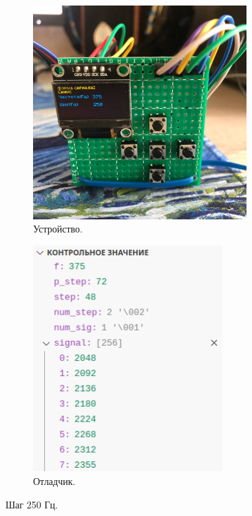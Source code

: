 	\begin{figure}[H]
     \begin{subfigure}[H]{0.5\textwidth}
         \centering
         \includegraphics[width=0.9\textwidth]{../image/test2_u_f.jpg}
         \caption{Устройство.}
     \end{subfigure}
     \hfill
     \begin{subfigure}[H]{0.5\textwidth}
         \centering
         \includegraphics[width=0.8\textwidth]{../image/test2_o_f.png}
         \caption{Отладчик.}
     \end{subfigure}
        \caption{Шаг 250 Гц.}
	\end{figure}
	
